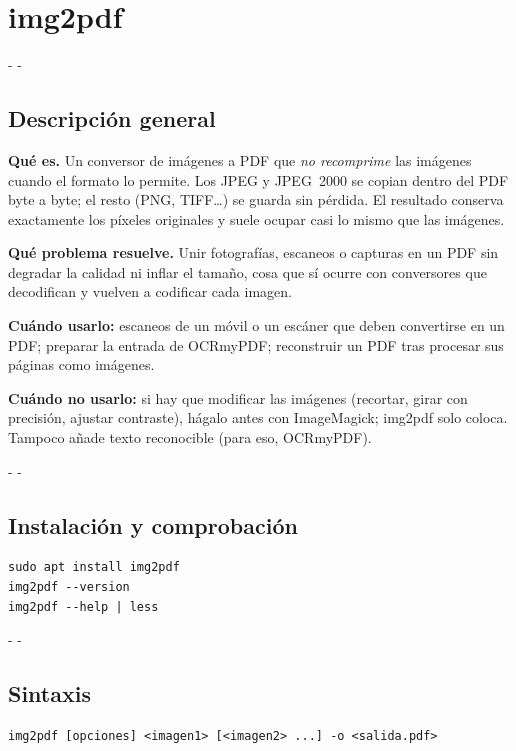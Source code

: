 \documentclass[11pt,a4paper]{article}
\makeatletter
\newcommand{\necesitaespacio}[1]{\par\penalty-100\begingroup
	\setlength{\dimen@}{#1}\dimen@ii\pagegoal\advance\dimen@ii-\pagetotal
	\ifdim\dimen@>\dimen@ii\ifdim\dimen@ii>\z@\vfil\fi\penalty-\@M\fi\endgroup}
\makeatother
\begin{document}
	\section{img2pdf}\label{sec:img2pdf}
	
	\necesitaespacio{8\baselineskip}
	\subsection{Descripción general}
	
	\textbf{Qué es.} Un conversor de imágenes a PDF que \emph{no recomprime} las imágenes cuando el formato lo permite. Los JPEG y JPEG~2000 se copian dentro del PDF byte a byte; el resto (PNG, TIFF\ldots) se guarda sin pérdida. El resultado conserva exactamente los píxeles originales y suele ocupar casi lo mismo que las imágenes.
	
	\textbf{Qué problema resuelve.} Unir fotografías, escaneos o capturas en un PDF sin degradar la calidad ni inflar el tamaño, cosa que sí ocurre con conversores que decodifican y vuelven a codificar cada imagen.
	
	\textbf{Cuándo usarlo:} escaneos de un móvil o un escáner que deben convertirse en un PDF; preparar la entrada de OCRmyPDF; reconstruir un PDF tras procesar sus páginas como imágenes.
	
	\textbf{Cuándo no usarlo:} si hay que modificar las imágenes (recortar, girar con precisión, ajustar contraste), hágalo antes con ImageMagick; img2pdf solo coloca. Tampoco añade texto reconocible (para eso, OCRmyPDF).
	
	\necesitaespacio{8\baselineskip}
	\subsection{Instalación y comprobación}
	
	\begin{lstlisting}
sudo apt install img2pdf
img2pdf --version
img2pdf --help | less
\end{lstlisting}
	
	\necesitaespacio{8\baselineskip}
	\subsection{Sintaxis}
	
	\begin{lstlisting}[style=sintaxis]
img2pdf [opciones] <imagen1> [<imagen2> ...] -o <salida.pdf>
\end{lstlisting}
	
\end{document}

